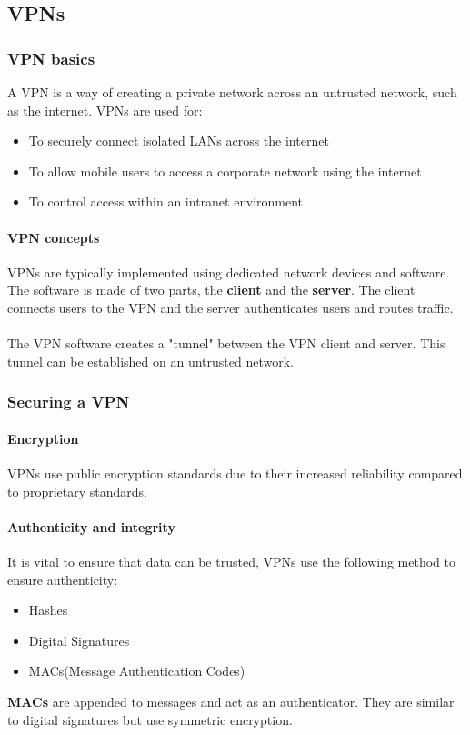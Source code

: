 \documentclass{article}[18pt]
\begin{document}
\subsection{VPNs}
\subsubsection{VPN basics}
A VPN is a way of creating a private network across an untrusted network, such as the internet.
VPNs are used for:
\begin{itemize}
\item To securely connect isolated LANs across the internet
\item To allow mobile users to access a corporate network using the internet
\item To control access within an intranet environment
\end{itemize}
\paragraph{VPN concepts}
VPNs are typically implemented using dedicated network devices and software. The software is made of two parts, the \textbf{client} and the \textbf{server}. The client connects users to the VPN and the server authenticates users and routes traffic.\\
\\
The VPN software creates a "tunnel" between the VPN client and server. This tunnel can be established on an untrusted network.
\subsubsection{Securing a VPN}
\paragraph{Encryption}
VPNs use public encryption standards due to their increased reliability compared to proprietary standards.
\paragraph{Authenticity and integrity}
It is vital to ensure that data can be trusted, VPNs use the following method to ensure authenticity:
\begin{itemize}
\item Hashes
\item Digital Signatures
\item MACs(Message Authentication Codes)
\end{itemize}
\textbf{MACs} are appended to messages and act as an authenticator. They are similar to digital signatures but use symmetric encryption.
\end{document}
